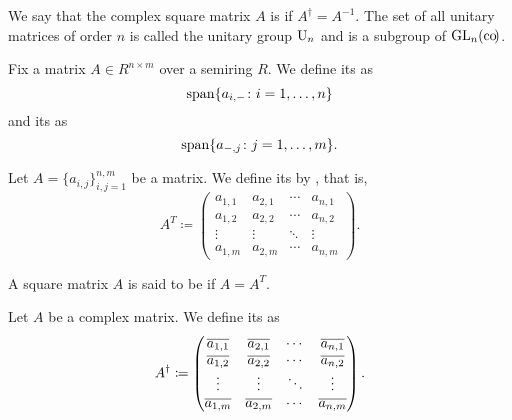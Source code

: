 \begin{definition}\label{def:unitary_matrix}
  We say that the complex square matrix \( A \) is  if \( A^\dagger = A^{-1} \). The set of all unitary matrices of order \( n \) is called the unitary group \( \operatorname{U}_n \) and is a subgroup of \( \operatorname{GL}_n(\operatorname{co}\!) \).
\end{definition}

\begin{definition}\label{def:matrix_column_and_row_space}
  Fix a matrix \( A \in R^{n \times m} \) over a semiring \( R \). We define its  as
  \begin{equation*}
    \operatorname{span} \{ a_{i,-} \colon i = 1, \ldots, n \}
  \end{equation*}
  and its  as
  \begin{equation*}
    \operatorname{span} \{ a_{-,j} \colon j = 1, \ldots, m \}.
  \end{equation*}
\end{definition}

\begin{definition}\label{def:matrix_transpose}
  Let \( A = \{ a_{i,j} \}_{i,j=1}^{n,m} \) be a matrix. We define its  by , that is,
  \begin{equation*}
    A^T \coloneqq \begin{pmatrix}
      a_{1,1} & a_{2,1} & \cdots & a_{n,1} \\
      a_{1,2} & a_{2,2} & \cdots & a_{n,2} \\
      \vdots  & \vdots  & \ddots & \vdots  \\
      a_{1,m} & a_{2,m} & \cdots & a_{n,m}
    \end{pmatrix}.
  \end{equation*}
\end{definition}

\begin{definition}\label{def:symmetric_matrix}
  A square matrix \( A \) is said to be  if \( A = A^T \).
\end{definition}

\begin{definition}\label{def:matrix_conjugate_transpose}
  Let \( A \) be a complex matrix. We define its  as
  \begin{equation*}
    A^\dagger \coloneqq \begin{pmatrix}
      \overline{a_{1,1}} & \overline{a_{2,1}} & \cdots & \overline{a_{n,1}} \\
      \overline{a_{1,2}} & \overline{a_{2,2}} & \cdots & \overline{a_{n,2}} \\
      \vdots       & \vdots       & \ddots & \vdots       \\
      \overline{a_{1,m}} & \overline{a_{2,m}} & \cdots & \overline{a_{n,m}}
    \end{pmatrix}.
  \end{equation*}
\end{definition}


